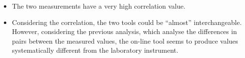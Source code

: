 \begin{frame}
\begin{itemize}
 \item The two measurements have a very high correlation value.  
 \item Considering the correlation, the two tools could be ``almost'' interchangeable. However, considering the previous analysis, which analyse the differences in pairs between the measured values, the on-line tool seems to produce values systematically different from the laboratory instrument.
 \end{itemize}

\end{frame}

